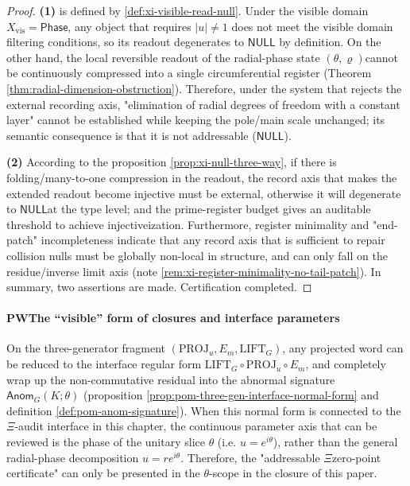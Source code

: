 \begin{proof}
\textbf{(1)} is defined by \ref{def:xi-visible-read-null}. Under the visible domain \(X_{\mathrm{vis}}=\mathsf{Phase}\), any object that requires \(|u|\neq 1\) does not meet the visible domain filtering conditions, so its readout degenerates to \(\mathsf{NULL}\) by definition.
On the other hand, the local reversible readout of the radial-phase state \((\theta,\varrho)\) ​​cannot be continuously compressed into a single circumferential register (Theorem \ref{thm:radial-dimension-obstruction}). Therefore, under the system that rejects the external recording axis, "elimination of radial degrees of freedom with a constant layer" cannot be established while keeping the pole/main scale unchanged; its semantic consequence is that it is not addressable (\(\mathsf{NULL}\)).
\par
\textbf{(2)} According to the proposition \ref{prop:xi-null-three-way}, if there is folding/many-to-one compression in the readout, the record axis that makes the extended readout become injective must be external, otherwise it will degenerate to \(\mathsf{NULL}\) ​​at the type level; and the prime-register budget gives an auditable threshold to achieve injectiveization.
Furthermore, register minimality and "end-patch" incompleteness indicate that any record axis that is sufficient to repair collision nulls must be globally non-local in structure, and can only fall on the residue/inverse limit axis (note \ref{rem:xi-register-minimality-no-tail-patch}).
In summary, two assertions are made. Certification completed.
\end{proof}

\paragraph{\(\mathbf{PW}\) ​​The “visible” form of closures and interface parameters}
On the three-generator fragment \((\mathrm{PROJ}_u,E_m,\mathrm{LIFT}_G)\), any projected word can be reduced to the interface regular form
\(\mathrm{LIFT}_G\circ\mathrm{PROJ}_u\circ E_m\), and completely wrap up the non-commutative residual into the abnormal signature \(\mathsf{Anom}_G(K;\theta)\) (proposition \ref{prop:pom-three-gen-interface-normal-form} and definition \ref{def:pom-anom-signature}).
When this normal form is connected to the \(\Xi\)-audit interface in this chapter, the continuous parameter axis that can be reviewed is the phase of the unitary slice \(\theta\) (i.e. \(u=e^{i\theta}\)), rather than the general radial-phase decomposition \(u=re^{i\theta}\).
Therefore, the "addressable \(\Xi\) ​​zero-point certificate" can only be presented in the \(\theta\)-scope in the closure of this paper.

